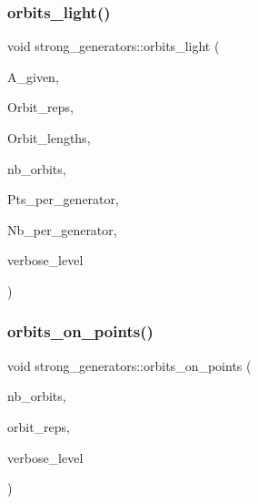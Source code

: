 \subsubsection{\texorpdfstring{orbits\+\_\+light()}{orbits\_light()}}
{\footnotesize\ttfamily void strong\+\_\+generators\+::orbits\+\_\+light (\begin{DoxyParamCaption}\item[{\mbox{\hyperlink{classaction}{action}} $\ast$}]{A\+\_\+given,  }\item[{\mbox{\hyperlink{galois_8h_a09fddde158a3a20bd2dcadb609de11dc}{I\+NT}} $\ast$\&}]{Orbit\+\_\+reps,  }\item[{\mbox{\hyperlink{galois_8h_a09fddde158a3a20bd2dcadb609de11dc}{I\+NT}} $\ast$\&}]{Orbit\+\_\+lengths,  }\item[{\mbox{\hyperlink{galois_8h_a09fddde158a3a20bd2dcadb609de11dc}{I\+NT}} \&}]{nb\+\_\+orbits,  }\item[{\mbox{\hyperlink{galois_8h_a09fddde158a3a20bd2dcadb609de11dc}{I\+NT}} $\ast$$\ast$\&}]{Pts\+\_\+per\+\_\+generator,  }\item[{\mbox{\hyperlink{galois_8h_a09fddde158a3a20bd2dcadb609de11dc}{I\+NT}} $\ast$\&}]{Nb\+\_\+per\+\_\+generator,  }\item[{\mbox{\hyperlink{galois_8h_a09fddde158a3a20bd2dcadb609de11dc}{I\+NT}}}]{verbose\+\_\+level }\end{DoxyParamCaption})}

\mbox{\label{classstrong__generators_a0db41e5d931067f14ae1066e89988fba}} 
\subsubsection{\texorpdfstring{orbits\+\_\+on\+\_\+points()}{orbits\_on\_points()}}
{\footnotesize\ttfamily void strong\+\_\+generators\+::orbits\+\_\+on\+\_\+points (\begin{DoxyParamCaption}\item[{\mbox{\hyperlink{galois_8h_a09fddde158a3a20bd2dcadb609de11dc}{I\+NT}} \&}]{nb\+\_\+orbits,  }\item[{\mbox{\hyperlink{galois_8h_a09fddde158a3a20bd2dcadb609de11dc}{I\+NT}} $\ast$\&}]{orbit\+\_\+reps,  }\item[{\mbox{\hyperlink{galois_8h_a09fddde158a3a20bd2dcadb609de11dc}{I\+NT}}}]{verbose\+\_\+level }\end{DoxyParamCaption})}

